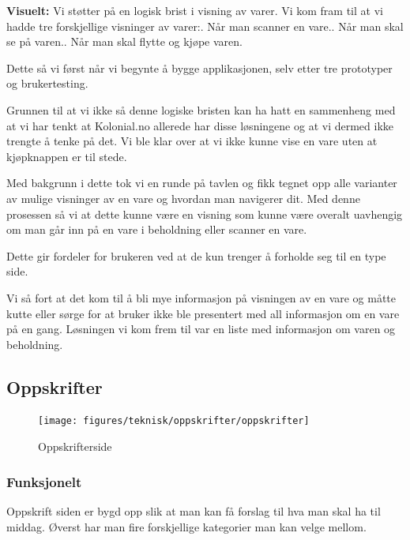 \textbf{Visuelt:}
Vi støtter på en logisk brist i visning av varer. Vi kom fram til at vi hadde tre forskjellige visninger av varer:. Når man scanner en vare.. Når man skal se på varen.. Når man skal flytte og kjøpe varen.\newline 

Dette så vi først når vi begynte å bygge applikasjonen, selv etter tre prototyper og brukertesting.

Grunnen til at vi ikke så denne logiske bristen kan ha hatt en sammenheng med at vi har tenkt at Kolonial.no allerede har disse løsningene og at vi dermed ikke trengte å tenke på det. Vi ble klar over at vi ikke kunne vise en vare uten at kjøpknappen er til stede.

Med bakgrunn i dette tok vi en runde på tavlen og fikk tegnet opp alle varianter av mulige visninger av en vare og hvordan man navigerer dit. Med denne prosessen så vi at dette kunne være en visning som kunne være overalt uavhengig om man går inn på en vare i beholdning eller scanner en vare. 

Dette gir fordeler for brukeren ved at de kun trenger å forholde seg til en type side. 

Vi så fort at det kom til å bli mye informasjon på visningen av en vare og måtte kutte eller sørge for at bruker ikke ble presentert med all informasjon om en vare på en gang. Løsningen vi kom frem til var en liste med informasjon om varen og beholdning.

\subsection{\textbf{Oppskrifter}}
\begin{figure}[H]
    \texttt{[image: figures/teknisk/oppskrifter/oppskrifter]}
    \caption[Oppskrifter]{Oppskrifterside
    \label{fig:oppskrifter}}
\end{figure}

\subsubsection{\textbf{Funksjonelt}}
Oppskrift siden er bygd opp slik at man kan få forslag til hva man skal ha til middag. Øverst har man fire forskjellige kategorier man kan velge mellom.

